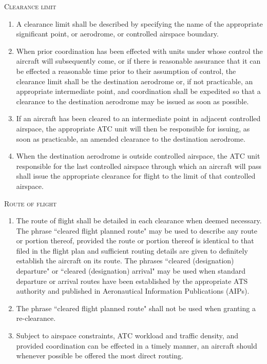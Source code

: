 \documentclass[../vATM.tex]{subfiles}
\begin{document}
    \begin{enumeratesc}
        \item \textsc{Clearance limit}
        \begin{enumerate}
            \item A clearance limit shall be described by specifying the name of the appropriate significant point, or aerodrome, or controlled airspace boundary.
            \item When prior coordination has been effected with units under whose control the aircraft will subsequently come, or if there is reasonable assurance that it can be effected a reasonable time prior to their assumption of control, the clearance limit shall be the destination aerodrome or, if not practicable, an appropriate intermediate point, and coordination shall be expedited so that a clearance to the destination aerodrome may be issued as soon as possible.
            \item If an aircraft has been cleared to an intermediate point in adjacent controlled airspace, the appropriate ATC unit will then be responsible for issuing, as soon as practicable, an amended clearance to the destination aerodrome.
            \item When the destination aerodrome is outside controlled airspace, the ATC unit responsible for the last controlled airspace through which an aircraft will pass shall issue the appropriate clearance for flight to the limit of that controlled airspace.
        \end{enumerate}

        \item \textsc{Route of flight}
        \begin{enumerate}
            \item The route of flight shall be detailed in each clearance when deemed necessary. The phrase ``cleared flight planned route" may be used to describe any route or portion thereof, provided the route or portion thereof is identical to that filed in the flight plan and sufficient routing details are given to definitely establish the aircraft on its route. The phrases ``cleared (designation) departure" or ``cleared (designation) arrival" may be used when standard departure or arrival routes have been established by the appropriate ATS authority and published in Aeronautical Information Publications (AIPs).
            \item The phrase ``cleared flight planned route" shall not be used when granting a re-clearance.
            \item Subject to airspace constraints, ATC workload and traffic density, and provided coordination can be effected in a timely manner, an aircraft should whenever possible be offered the most direct routing.
        \end{enumerate}


\end{enumeratesc}
\end{document}
